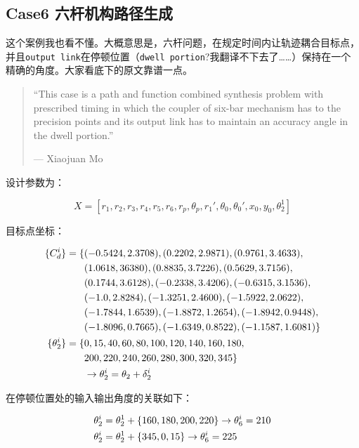 \documentclass[]{ctexbook}
\theoremstyle{definition}
\theoremstyle{definition}
\theoremstyle{definition}
\theoremstyle{remark}
\begin{document}
\subsection{Case6 六杆机构路径生成}\label{case6-}

这个案例我也看不懂。大概意思是，六杆问题，在规定时间内让轨迹耦合目标点，并且\texttt{output\ link}在停顿位置（\texttt{dwell\ portion}?我翻译不下去了\ldots{}\ldots{}）保持在一个精确的角度。大家看底下的原文靠谱一点。

\begin{quote}
``This case is a path and function combined synthesis problem with
prescribed timing in which the coupler of six-bar mechanism has to the
precision points and its output link has to maintain an accuracy angle
in the dwell portion.''

\begin{flushright}--- Xiaojuan Mo\end{flushright}
\end{quote}

设计参数为：

\[
X = [r_1,r_2,r_3,r_4,r_5,r_6,r_p,\theta_p,r_1',\theta_0,\theta_0',x_0,y_0,\theta_2^1] 
\]

目标点坐标：

\begin{align}
\{C_d^i\} = \{&(-0.5424,2.3708),(0.2202,2.9871),(0.9761,3.4633), \notag \\
&(1.0618,36380),(0.8835,3.7226),(0.5629,3.7156),\notag \\
&(0.1744,3.6128),(-0.2338,3.4206),(-0.6315,3.1536), \notag \\
&(-1.0,2.8284),(-1.3251,2.4600),(-1.5922,2.0622), \notag \\
&(-1.7844,1.6539),(-1.8872,1.2654),(-1.8942,0.9448), \notag \\
&(-1.8096,0.7665),(-1.6349,0.8522),(-1.1587,1.6081)\} \notag \\
\{\theta_2^i\} = \{&0,15,40,60,80,100,120,140,160,180,\notag \\
& 200, 220,240,260,280,300,320,345\} \notag \\
& \rightarrow \theta_2^i = \theta_2 + \delta_2^i \notag \\
\end{align}

在停顿位置处的输入输出角度的关联如下：

\begin{align}
&\theta_2^i = \theta_2^1+\{160,180,200,220\}\rightarrow \theta_6^i=210 \notag \\
&\theta_2^i=\theta_2^1+\{345,0,15\} \rightarrow \theta_6^i = 225 \notag \\
\end{align}
\end{document}
